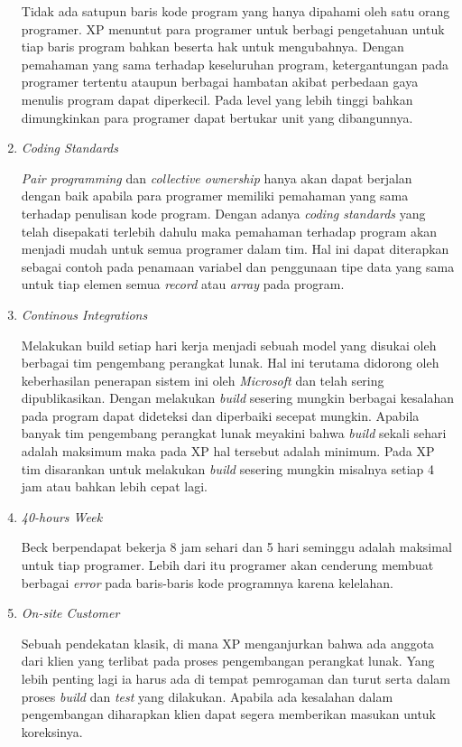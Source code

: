 \begin{enumerate}
      Tidak ada satupun baris kode program yang hanya dipahami oleh satu orang programer. XP menuntut para programer untuk berbagi pengetahuan untuk tiap baris program bahkan beserta hak untuk mengubahnya. Dengan pemahaman yang sama terhadap keseluruhan program, ketergantungan pada programer tertentu ataupun berbagai hambatan akibat perbedaan gaya menulis program dapat diperkecil. Pada level yang lebih tinggi bahkan dimungkinkan para programer dapat bertukar unit yang dibangunnya.
      \item \emph{Coding Standards}
      
      \emph{Pair programming} dan \emph{collective ownership} hanya akan dapat berjalan dengan baik apabila para programer memiliki pemahaman yang sama terhadap penulisan kode program. Dengan adanya \emph{coding standards} yang telah disepakati terlebih dahulu maka pemahaman terhadap program akan menjadi mudah untuk semua programer dalam tim. Hal ini dapat diterapkan sebagai contoh pada penamaan variabel dan penggunaan tipe data yang sama untuk tiap elemen semua \emph{record} atau \emph{array} pada program.
      \item \emph{Continous Integrations}
      
      Melakukan build setiap hari kerja menjadi sebuah model yang disukai oleh berbagai tim pengembang perangkat lunak. Hal ini terutama didorong oleh keberhasilan penerapan sistem ini oleh \emph{Microsoft} dan telah sering dipublikasikan. Dengan melakukan \emph{build} sesering mungkin berbagai kesalahan pada program dapat dideteksi dan diperbaiki secepat mungkin. Apabila banyak tim pengembang perangkat lunak meyakini bahwa \emph{build} sekali sehari adalah maksimum maka pada XP hal tersebut adalah minimum. Pada XP tim disarankan untuk melakukan \emph{build} sesering mungkin misalnya setiap 4 jam atau bahkan lebih cepat lagi.
      \item \emph{40-hours Week}
      
      Beck berpendapat bekerja 8 jam sehari dan 5 hari seminggu adalah maksimal untuk tiap programer. Lebih dari itu programer akan cenderung membuat berbagai \emph{error} pada baris-baris kode programnya karena kelelahan.
      \item \emph{On-site Customer}
      
      Sebuah pendekatan klasik, di mana XP menganjurkan bahwa ada anggota dari klien yang terlibat pada proses pengembangan perangkat lunak. Yang lebih penting lagi ia harus ada di tempat pemrogaman dan turut serta dalam proses \emph{build} dan \emph{test} yang dilakukan. Apabila ada kesalahan dalam pengembangan diharapkan klien dapat segera memberikan masukan untuk koreksinya.
  \end{enumerate}


